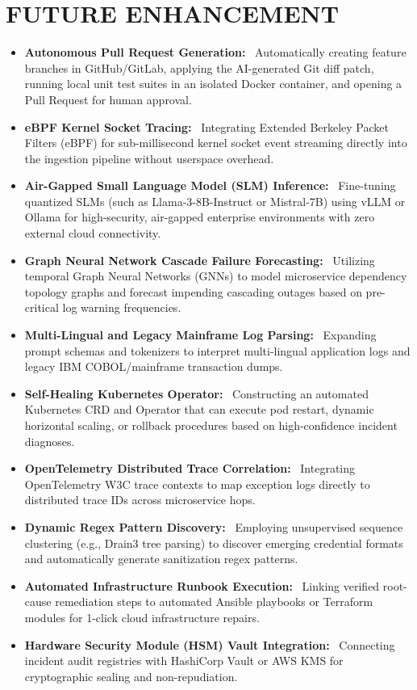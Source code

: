 \documentclass[12pt,a4paper]{article}
\newcommand{\lead}[1]{\textbf{#1}\ }
\begin{document}

\section{FUTURE ENHANCEMENT}\label{sec:future_enhancement}
\begin{itemize}[leftmargin=1.2em,itemsep=6pt]
    \item \lead{Autonomous Pull Request Generation:} Automatically creating feature branches in GitHub/GitLab, applying the AI-generated Git diff patch, running local unit test suites in an isolated Docker container, and opening a Pull Request for human approval.
    \item \lead{eBPF Kernel Socket Tracing:} Integrating Extended Berkeley Packet Filters (eBPF) for sub-millisecond kernel socket event streaming directly into the ingestion pipeline without userspace overhead.
    \item \lead{Air-Gapped Small Language Model (SLM) Inference:} Fine-tuning quantized SLMs (such as Llama-3-8B-Instruct or Mistral-7B) using vLLM or Ollama for high-security, air-gapped enterprise environments with zero external cloud connectivity.
    \item \lead{Graph Neural Network Cascade Failure Forecasting:} Utilizing temporal Graph Neural Networks (GNNs) to model microservice dependency topology graphs and forecast impending cascading outages based on pre-critical log warning frequencies.
    \item \lead{Multi-Lingual and Legacy Mainframe Log Parsing:} Expanding prompt schemas and tokenizers to interpret multi-lingual application logs and legacy IBM COBOL/mainframe transaction dumps.
    \item \lead{Self-Healing Kubernetes Operator:} Constructing an automated Kubernetes CRD and Operator that can execute pod restart, dynamic horizontal scaling, or rollback procedures based on high-confidence incident diagnoses.
    \item \lead{OpenTelemetry Distributed Trace Correlation:} Integrating OpenTelemetry W3C trace contexts to map exception logs directly to distributed trace IDs across microservice hops.
    \item \lead{Dynamic Regex Pattern Discovery:} Employing unsupervised sequence clustering (e.g., Drain3 tree parsing) to discover emerging credential formats and automatically generate sanitization regex patterns.
    \item \lead{Automated Infrastructure Runbook Execution:} Linking verified root-cause remediation steps to automated Ansible playbooks or Terraform modules for 1-click cloud infrastructure repairs.
    \item \lead{Hardware Security Module (HSM) Vault Integration:} Connecting incident audit registries with HashiCorp Vault or AWS KMS for cryptographic sealing and non-repudiation.
\end{itemize}
\end{document}
